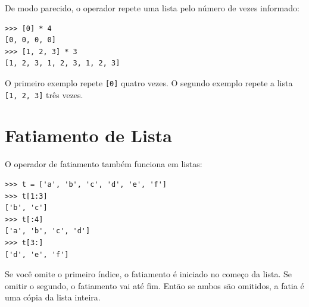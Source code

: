 De modo parecido, o operador {\tt *} repete uma lista pelo número de vezes informado:


\beforeverb
\begin{verbatim}
>>> [0] * 4
[0, 0, 0, 0]
>>> [1, 2, 3] * 3
[1, 2, 3, 1, 2, 3, 1, 2, 3]
\end{verbatim}
\afterverb
%

O primeiro exemplo repete {\tt [0]} quatro vezes. O segundo exemplo
repete a lista {\tt [1, 2, 3]} três vezes.

\section{Fatiamento de Lista}


O operador de fatiamento também funciona em listas:

\beforeverb
\begin{verbatim}
>>> t = ['a', 'b', 'c', 'd', 'e', 'f']
>>> t[1:3]
['b', 'c']
>>> t[:4]
['a', 'b', 'c', 'd']
>>> t[3:]
['d', 'e', 'f']
\end{verbatim}
\afterverb
%

Se você omite o primeiro índice, o fatiamento é iniciado no começo da lista.
Se omitir o segundo, o fatiamento vai até fim. Então se ambos são omitidos,
a fatia é uma cópia da lista inteira.

